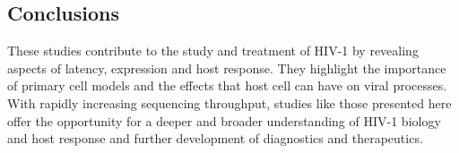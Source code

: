 \documentclass[../sherrill-Mix_thesis.tex]{subfiles}
\begin{document}
\subsection{Conclusions}
	These studies contribute to the study and treatment of HIV-1 by revealing aspects of latency, expression and host response. They highlight the importance of primary cell models and the effects that host cell can have on viral processes. With rapidly increasing sequencing throughput, studies like those presented here offer the opportunity for a deeper and broader understanding of HIV-1 biology and host response and further development of diagnostics and therapeutics.
\end{document}
